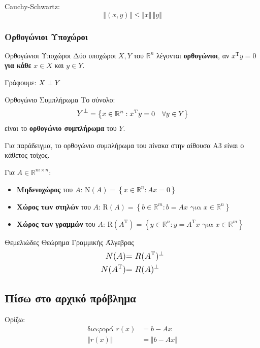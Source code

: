 \documentclass[11pt,a4paper,notitlepage,fleqn,final]{article}
\begin{document}
	Cauchy-Schwartz:
	\[
	\left\Vert(x,y)\right\Vert \leq \Vert x\Vert \,\Vert y\Vert
	\]

	\subsubsection{Ορθογώνιοι Υποχώροι}
	\begin{defn}{Ορθογώνιοι Υποχώροι}{}
		Δύο υποχώροι \( X,Y \) του  \( \mathbb R^n \) λέγονται
		\textbf{ορθογώνιοι}, αν \( x^{\mathrm T}y = 0 \) \textbf{για
		κάθε} \( x \in X \) και \( y \in Y \).

	    Γράφουμε: \( \mathlarger{X \perp Y} \)
	\end{defn}
	\begin{defn}{Ορθογώνιο Συμπλήρωμα}{}
		Το σύνολο:
		\[
		\mathlarger{
			Y^\perp
			} = \left\lbrace
			x \in \mathbb R^n : x^{\mathrm T}y = 0 \quad
			\forall y \in Y
			 \right\rbrace
		\]
		είναι το \textbf{ορθογώνιο συμπλήρωμα} του \( Y \).

		Για παράδειγμα, το ορθογώνιο συμπλήρωμα του πίνακα στην αίθουσα
		Α3 είναι ο κάθετος τοίχος.
	\end{defn}
	\begin{defn}{}{}
		Για \( A \in \mathbb R^{m \times n} \):
		\begin{itemize}
			\item \textbf{Μηδενοχώρος} του \( A \):
			\( \mathrm N(A) = \left\lbrace x\in\mathbb R^n: Ax=0
			 \right\rbrace \)
			\item \textbf{Χώρος των στηλών} του \( A \):
			\( \mathrm R(A)  = \left\lbrace
			b \in \mathbb R^m: b = Ax \text{ για }
			x \in \mathbb R^n \right\rbrace
			\)
			\item \textbf{Χώρος των γραμμών} του \( A \):
			\( \mathrm R(A^{\mathrm T}) = \left\lbrace
			y \in \mathbb R^n: y = A^{\mathrm T}x \text{ για }
			x \in \mathbb R^m
			 \right\rbrace \)
		\end{itemize}
	\end{defn}
	\begin{theorem}{Θεμελιώδες Θεώρημα Γραμμικής Άλγεβρας}{}
		\begin{align*}
			\mathlarger{N(A)} &\mathlarger{= R(A^{\mathrm T})^\perp}
			\\
			\mathlarger{N(A^{\mathrm T})} &\mathlarger{= R(A)^\perp}
		\end{align*}
	\end{theorem}

    \subsection{Πίσω στο αρχικό πρόβλημα}
    Ορίζω:
    \begin{align*}
    \text{διαφορά } r(x) &= b - Ax \\
    \left\Vert r(x)\right\Vert &= \Vert b-Ax\Vert
    \end{align*}
\end{document}
